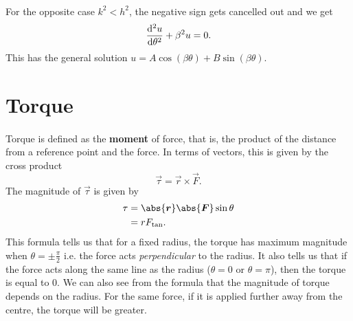 \documentclass[../classical_mechanics.tex]{subfiles}
\begin{document}
\begin{example}
            \paragraph{}
            For the opposite case $k^2<h^2$, the negative sign gets cancelled out and we get
            \begin{equation}
                \dv[2]{u}{\theta}+\beta^2 u=0.
            \end{equation}
            This has the general solution $u=A\cos(\beta\theta)+B\sin(\beta\theta)$.

        \end{example}

    \section{Torque}
        \paragraph{}
        Torque is defined as the \textbf{moment} of force, that is, the product of the distance from a reference point and the force.
        In terms of vectors, this is given by the cross product
        \begin{equation}
            \vec{\tau}=\vec{r}\times\vec{F}.
        \end{equation}
        The magnitude of $\vec{\tau}$ is given by
        \begin{align}
            \tau&=\abs{\vec{r}}\abs{\vec{F}}\sin\theta\\
            &=rF_\text{tan}.
        \end{align}
        This formula tells us that for a fixed radius, the torque has maximum magnitude when $\theta=\pm\frac{\pi}{2}$ i.e. the force acts \textit{perpendicular} to the radius.
        It also tells us that if the force acts along the same line as the radius ($\theta=0$ or $\theta=\pi$), then the torque is equal to 0.
        We can also see from the formula that the magnitude of torque depends on the radius.
        For the same force, if it is applied further away from the centre, the torque will be greater.
    
\end{document}
